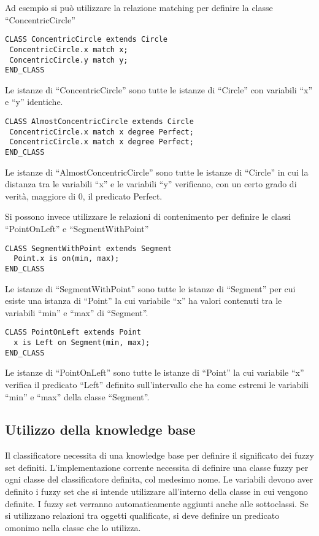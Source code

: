 Ad esempio si può utilizzare la relazione matching per definire la classe ``ConcentricCircle''
\begin{verbatim}
CLASS ConcentricCircle extends Circle 
 ConcentricCircle.x match x;
 ConcentricCircle.y match y; 
END_CLASS
\end{verbatim}

Le istanze di ``ConcentricCircle'' sono tutte le istanze di ``Circle'' con variabili ``x'' e ``y'' identiche. 

\begin{verbatim}
CLASS AlmostConcentricCircle extends Circle 
 ConcentricCircle.x match x degree Perfect;
 ConcentricCircle.x match x degree Perfect; 
END_CLASS
\end{verbatim}

Le istanze di ``AlmostConcentricCircle'' sono tutte le istanze di ``Circle'' in cui la distanza  tra le variabili ``x'' e le variabili ``y'' verificano, con un certo grado di verità, maggiore di 0,  il predicato Perfect.

Si possono invece utilizzare le relazioni di contenimento per definire le classi ``PointOnLeft'' e ``SegmentWithPoint''

\begin{verbatim}
CLASS SegmentWithPoint extends Segment
  Point.x is on(min, max);
END_CLASS
\end{verbatim}

Le istanze di ``SegmentWithPoint'' sono tutte le istanze di ``Segment'' per cui esiste una istanza di ``Point'' la cui variabile ``x'' ha valori contenuti tra le variabili ``min'' e ``max'' di ``Segment''.

\begin{verbatim}
CLASS PointOnLeft extends Point 
  x is Left on Segment(min, max);
END_CLASS
\end{verbatim}

Le istanze di ``PointOnLeft'' sono tutte le istanze di ``Point'' la cui variabile ``x'' verifica il predicato ``Left'' definito sull'intervallo che ha come estremi le variabili ``min'' e ``max'' della classe ``Segment''.


\subsection{Utilizzo della knowledge base}
Il classificatore necessita di una knowledge base per definire il significato dei fuzzy set definiti. 
L'implementazione corrente necessita di definire una classe fuzzy per ogni classe del classificatore definita, col medesimo nome.
Le variabili devono aver definito i fuzzy set che si intende utilizzare all'interno della classe in cui vengono definite. I fuzzy set verranno automaticamente aggiunti anche alle sottoclassi.
Se si utilizzano relazioni tra oggetti qualificate, si deve definire un predicato omonimo nella classe che lo utilizza.

